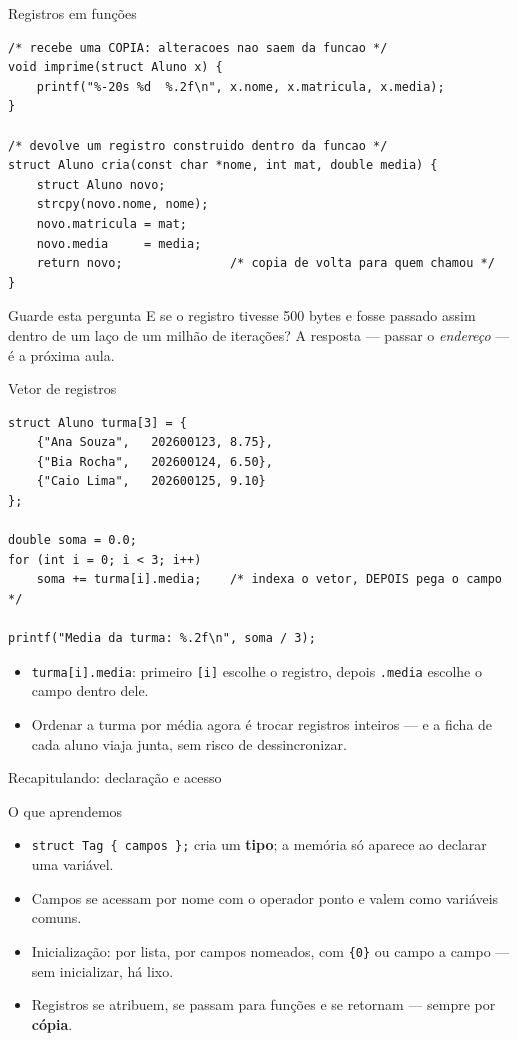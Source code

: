 \documentclass[aspectratio=169]{beamer}
\begin{document}
\begin{frame}[fragile]{Registros em funções}
\begin{lstlisting}[basicstyle=\ttfamily\tiny]
/* recebe uma COPIA: alteracoes nao saem da funcao */
void imprime(struct Aluno x) {
    printf("%-20s %d  %.2f\n", x.nome, x.matricula, x.media);
}

/* devolve um registro construido dentro da funcao */
struct Aluno cria(const char *nome, int mat, double media) {
    struct Aluno novo;
    strcpy(novo.nome, nome);
    novo.matricula = mat;
    novo.media     = media;
    return novo;               /* copia de volta para quem chamou */
}
\end{lstlisting}
  \begin{exampleblock}{Guarde esta pergunta}
    E se o registro tivesse 500 bytes e fosse passado assim dentro de um laço de
    um milhão de iterações? A resposta --- passar o \emph{endereço} --- é a
    próxima aula.
  \end{exampleblock}
\end{frame}

\begin{frame}[fragile]{Vetor de registros}
\begin{lstlisting}[basicstyle=\ttfamily\scriptsize]
struct Aluno turma[3] = {
    {"Ana Souza",   202600123, 8.75},
    {"Bia Rocha",   202600124, 6.50},
    {"Caio Lima",   202600125, 9.10}
};

double soma = 0.0;
for (int i = 0; i < 3; i++)
    soma += turma[i].media;    /* indexa o vetor, DEPOIS pega o campo */

printf("Media da turma: %.2f\n", soma / 3);
\end{lstlisting}
  \begin{itemize}
    \item \texttt{turma[i].media}: primeiro \texttt{[i]} escolhe o registro,
      depois \texttt{.media} escolhe o campo dentro dele.
    \item Ordenar a turma por média agora é trocar registros inteiros --- e a
      ficha de cada aluno viaja junta, sem risco de dessincronizar.
  \end{itemize}
\end{frame}

\begin{frame}{Recapitulando: declaração e acesso}
  \begin{block}{O que aprendemos}
    \begin{itemize}
      \item \texttt{struct Tag \{ campos \};} cria um \textbf{tipo}; a memória
        só aparece ao declarar uma variável.
      \item Campos se acessam por nome com o operador ponto e valem como
        variáveis comuns.
      \item Inicialização: por lista, por campos nomeados, com \texttt{\{0\}} ou
        campo a campo --- sem inicializar, há lixo.
      \item Registros se atribuem, se passam para funções e se retornam ---
        sempre por \textbf{cópia}.
    \end{itemize}
  \end{block}
\end{frame}
\end{document}
